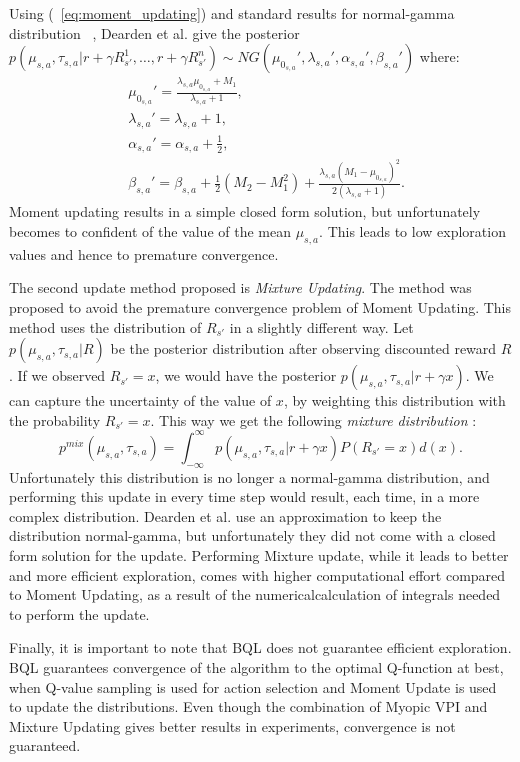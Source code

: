 Using (~\ref{eq:moment_updating}) and standard results for normal-gamma distribution ~\cite{degroot2012probability}, Dearden et al. give the posterior $p(\mu_{s,a},\tau_{s,a} | r+\gamma R_{s'}^1, \ldots, r+\gamma R_{s'}^n) \sim NG(\mu_{0_{s,a}}',\lambda_{s,a}',\alpha_{s,a}',\beta_{s,a}')$ where:
\begin{equation}
\begin{split}
	& \mu_{0_{s,a}}'=\frac{\lambda_{s,a} \mu_{0_{s,a}} + M_1}{\lambda_{s,a}+1}, \\
	& \lambda_{s,a}'=\lambda_{s,a}+1, \\
	& \alpha_{s,a}'=\alpha_{s,a}+ \frac{1}{2}, \\
	& \beta_{s,a}'=\beta_{s,a}+\frac{1}{2}(M_2-M_1^2)+ \frac{\lambda_{s,a}(M_1-\mu_{0_{s,a}})^2}{2(\lambda_{s,a}+1)}.
\end{split}
\end{equation}
Moment updating results in a simple closed form solution, but unfortunately becomes to confident of the value of the mean $\mu_{s,a}$. This leads to low exploration values and hence to premature convergence.\par
The second update method proposed is \emph{Mixture Updating}. The method was proposed to avoid the premature convergence problem of Moment Updating. This method uses the distribution of $R_{s'}$ in a slightly different way. Let $p(\mu_{s,a},\tau_{s,a}|R)$ be the posterior distribution after observing discounted reward $R$. If we observed $R_{s'}=x$, we would have the posterior $p(\mu_{s,a},\tau_{s,a}|r+ \gamma x)$. We can capture the uncertainty of the value of $x$, by weighting this distribution with the probability $R_{s'}=x$. This way we get the following \emph{mixture distribution} :
\begin{equation}
	p^{mix}(\mu_{s,a},\tau_{s,a})=\int_{-\infty}^{\infty} p(\mu_{s,a},\tau_{s,a} |r + \gamma x) P(R_{s'}=x) d(x).
\end{equation} 
Unfortunately this distribution is no longer a normal-gamma distribution, and performing this update in every time step would result, each time, in a more complex distribution. Dearden et al. use an approximation to keep the distribution normal-gamma, but unfortunately they did not come with a closed form solution for the update. Performing Mixture update, while it leads to better and more efficient exploration, comes with higher computational effort compared to Moment Updating, as a result of the numericalcalculation of integrals needed to perform the update. \par
Finally, it is important to note that BQL does not guarantee efficient exploration. BQL guarantees convergence of the algorithm to the optimal Q-function at best, when Q-value sampling is used for action selection and Moment Update is used to update the distributions. Even though the combination of Myopic VPI and Mixture Updating gives better results in experiments, convergence is not guaranteed.

